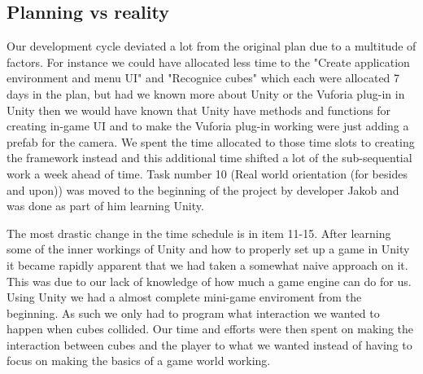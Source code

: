 \subsection{Planning vs reality}%
Our development cycle deviated a lot from the original plan due to a multitude of factors.
For instance we could have allocated less time to the "Create application environment and menu UI" and "Recognice cubes" which each were allocated 7 days in the plan, but had we known more about Unity or the Vuforia plug-in in Unity then we would have known that Unity have methods and functions for creating in-game UI and to make the Vuforia plug-in working were just adding a \gls{prefab} for the camera.
We spent the time allocated to those time slots to creating the framework instead and this additional time shifted a lot of the sub-sequential work a week ahead of time.
Task number 10 (Real world orientation (for besides and upon)) was moved to the beginning of the project by developer Jakob and was done as part of him learning Unity.

The most drastic change in the time schedule is in item 11-15.
After learning some of the inner workings of Unity and how to properly set up a game in Unity it became rapidly apparent that we had taken a somewhat naive approach on it. This was due to our lack of knowledge of how much a game engine can do for us.
Using Unity we had a almost complete mini-game enviroment from the beginning. As such we only had to program what interaction we wanted to happen when cubes collided.
Our time and efforts were then spent on making the interaction between cubes and the player to what we wanted instead of having to focus on making the basics of a game world working.